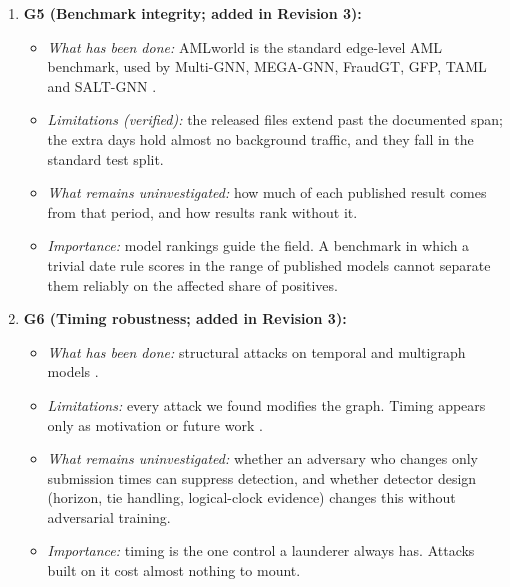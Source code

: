 \documentclass[11pt,a4paper]{article}
\begin{document}
\begin{enumerate}[leftmargin=*]
    \item \textbf{G5 (Benchmark integrity; added in Revision 3):}
    \begin{itemize}[leftmargin=*]
        \item \textit{What has been done:} AMLworld \cite{altman2023ibmaml} is the standard edge-level AML benchmark, used by Multi-GNN, MEGA-GNN, FraudGT, GFP, TAML and SALT-GNN \cite{egressy2024multigraph,bilgi2026mega,lin2024fraudgt,blanusa2024gfp,rico2026taml,losavio2026saltgnn}.
        \item \textit{Limitations (verified):} the released files extend past the documented span; the extra days hold almost no background traffic, and they fall in the standard test split.
        \item \textit{What remains uninvestigated:} how much of each published result comes from that period, and how results rank without it.
        \item \textit{Importance:} model rankings guide the field. A benchmark in which a trivial date rule scores in the range of published models cannot separate them reliably on the affected share of positives.
    \end{itemize}

    \item \textbf{G6 (Timing robustness; added in Revision 3):}
    \begin{itemize}[leftmargin=*]
        \item \textit{What has been done:} structural attacks on temporal and multigraph models \cite{dai2025memfreezing,jeon2025hia,sharma2023tdap,heijmans2026robust}.
        \item \textit{Limitations:} every attack we found modifies the graph. Timing appears only as motivation or future work \cite{heijmans2026robust}.
        \item \textit{What remains uninvestigated:} whether an adversary who changes only submission times can suppress detection, and whether detector design (horizon, tie handling, logical-clock evidence) changes this without adversarial training.
        \item \textit{Importance:} timing is the one control a launderer always has. Attacks built on it cost almost nothing to mount.
    \end{itemize}
\end{enumerate}

\end{document}
